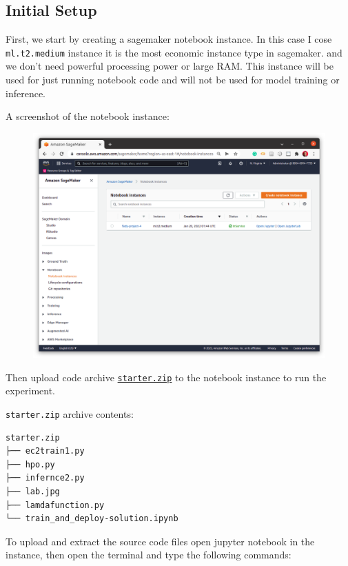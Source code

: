 \documentclass[a4paper
]{article}
\begin{document}
\hypertarget{initial-setup}{%
\subsection{Initial Setup}\label{initial-setup}}

First, we start by creating a sagemaker notebook instance. In this case
I cose \texttt{ml.t2.medium} instance it is the most economic instance
type in sagemaker. and we don't need powerful processing power or large
RAM. This instance will be used for just running notebook code and will
not be used for model training or inference.

A screenshot of the notebook instance:

\begin{figure}[H]
\centering
\includegraphics[]{../screenshots/01-a_sagemaker-notebook-instance.png}
\end{figure}

Then upload code archive
\href{https://video.udacity-data.com/topher/2021/September/613fd77f_starter/starter.zip}{\texttt{starter.zip}}
to the notebook instance to run the experiment.

\texttt{starter.zip} archive contents:

\begin{lstlisting}
starter.zip
├── ec2train1.py
├── hpo.py
├── infernce2.py
├── lab.jpg
├── lamdafunction.py
└── train_and_deploy-solution.ipynb
\end{lstlisting}

To upload and extract the source code files open jupyter notebook in the
instance, then open the terminal and type the following commands:
\end{document}

